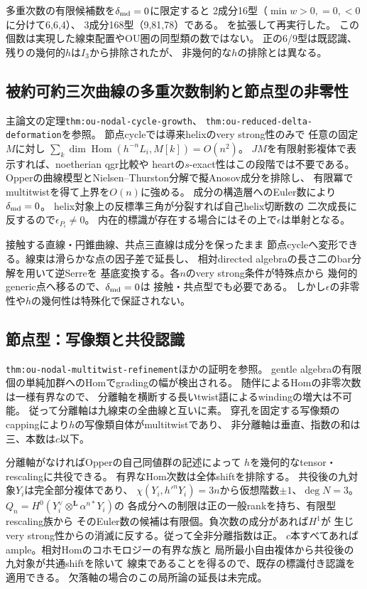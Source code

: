 \documentclass[11pt,a4paper]{ltjsarticle}
\begin{document}
多重次数の有限候補数を$\delta_{\rm md}=0$に限定すると
2成分16型（$\min w>0,=0,<0$に分けて6,6,4）、
3成分168型（9,81,78）である。
を拡張して再実行した。
この個数は実現した線束配置やOU圏の同型類の数ではない。
正の6/9型は既認識、残りの幾何的$h$は$I_3$から排除されたが、
非幾何的な$h$の排除とは異なる。

\subsection*{被約可約三次曲線の多重次数制約と節点型の非零性}
主論文の定理\texttt{thm:ou-nodal-cycle-growth}、
\texttt{thm:ou-reduced-delta-deformation}を参照。
節点cycleでは導来helixのvery strong性のみで
任意の固定$M$に対し
$\sum_k\dim\operatorname{Hom}(h^{-n}L_i,M[k])=O(n^2)$。
$JM$を有限射影複体で表示すれば、noetherian qgr比較や
heartの$s$-exact性はこの段階では不要である。
Opperの曲線模型とNielsen--Thurston分解で擬Anosov成分を排除し、
有限冪でmultitwistを得て上界を$O(n)$に強める。
成分の構造層へのEuler数により$\delta_{\rm md}=0$。
helix対象上の反標準三角が分裂すれば自己helix切断数の
二次成長に反するので$\epsilon_{P_i}\ne0$。
内在的標識が存在する場合にはその上で$\epsilon$は単射となる。

接触する直線・円錐曲線、共点三直線は成分を保ったまま
節点cycleへ変形できる。線束は滑らかな点の因子差で延長し、
相対directed algebraの長さ二のbar分解を用いて逆Serreを
基底変換する。各$n$のvery strong条件が特殊点から
幾何的generic点へ移るので、$\delta_{\rm md}=0$は
接触・共点型でも必要である。
しかし$\epsilon$の非零性や$h$の幾何性は特殊化で保証されない。

\subsection*{節点型：写像類と共役認識}
\texttt{thm:ou-nodal-multitwist-refinement}ほかの証明を参照。
gentle algebraの有限個の単純加群へのHomでgradingの幅が検出される。
随伴によるHomの非零次数は一様有界なので、
分離軸を横断する長いtwist語によるwindingの増大は不可能。
従って分離軸は九線束の全曲線と互いに素。
穿孔を固定する写像類のcappingにより$h$の写像類自体がmultitwistであり、
非分離軸は垂直、指数の和は三、本数は$c$以下。

分離軸がなければOpperの自己同値群の記述によって
$h$を幾何的なtensor・rescalingに共役できる。
有界なHom次数は全体shiftを排除する。
共役後の九対象$Y_i$は完全部分複体であり、
$\chi(Y_i,h'^nY_i)=3n$から仮想階数$\pm1$、$\deg N=3$。
$Q_n=H^0(Y_i^\vee\otimes^{\mathbf L}\alpha^{n*}Y_i)$の
各成分への制限は正の一般rankを持ち、有限型rescaling族から
そのEuler数の候補は有限個。負次数の成分があれば$H^1$が
生じvery strong性からの消滅に反する。従って全非分離指数は正。
$c$本すべてあればample。相対Homのコホモロジーの有界な族と
局所最小自由複体から共役後の九対象が共通shiftを除いて
線束であることを得るので、既存の標識付き認識を適用できる。
欠落軸の場合のこの局所論の延長は未完成。
\end{document}
